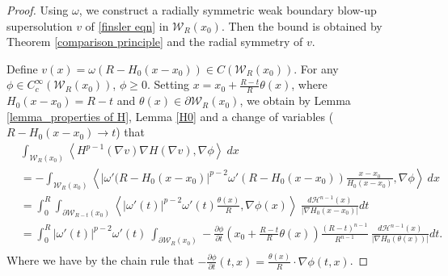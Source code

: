 \documentclass[11pt]{amsart}
\newcommand{\Fin}[1]{H^{p-1}(\nabla #1)\nabla H(\nabla #1)}
\numberwithin{equation}{section}
\begin{document}
 \begin{proof}
     Using $\omega$, we construct a radially symmetric weak boundary blow-up  supersolution $v$ of \eqref{finsler eqn} in $\mathcal{W}_{R}(x_{0})$. Then the bound is obtained by Theorem \ref{comparison principle} and the radial symmetry of $v$.

     
    Define $v(x)=\omega(R-H_{0}(x-x_{0}))\in C(\mathcal{W}_{R}(x_{0}))$. For any $\phi\in C_{c}^{\infty}(\mathcal{W}_{R}(x_{0}))$, $\phi\geq 0$. Setting $x=x_{0}+\frac{R-t}{R}\theta(x)$, where $H_{0}(x-x_{0})=R-t$ and $\theta(x)\in \partial \mathcal{W}_{R}(x_{0})$, we obtain  by Lemma \ref{lemma_properties of H}, Lemma \ref{H0} and a change of variables ($ R-H_{0}(x-x_{0})\to t$) that
     \begin{equation}\label{eqn_eta'}
     \begin{split}
    &\int_{\mathcal{W}_{R}(x_{0})}\left<\Fin{v}, \nabla\phi \right>\ dx\\
    &=-\int_{\mathcal{W}_{R}(x_{0})}\left<|\omega'(R-H_{0}(x-x_{0})|^{p-2}\omega'(R-H_{0}(x-x_{0})) \frac{x-x_{0}}{H_{0}(x-x_{0})}, \nabla \phi \right>\ dx\\
      &=\int_{0}^{R}\int_{\partial \mathcal{W}_{R-t}(x_{0})}\left<|\omega'(t)|^{p-2}\omega'(t) \frac{\theta(x)}{R}, \nabla \phi(x) \right> \ \frac{d\mathcal{H}^{n-1}(x)}{|\nabla H_{0}(x-x_{0})|} dt\\
        &=\int_{0}^{R}|\omega'(t)|^{p-2}\omega'(t)~ \int_{\partial \mathcal{W}_{R}(x_{0})}-\frac{\partial \phi}{\partial t}\left(x_{0}+\frac{R-t}{R}\theta(x)\right) \frac{(R-t)^{n-1}}{R^{n-1}} \ \frac{d\mathcal{H}^{n-1}(x)}{|\nabla H_{0}(\theta(x))|} dt.\\ 
         \end{split}
     \end{equation}
    Where we have by the chain rule that $-\frac{\partial \phi}{\partial t}(t,x)=\frac{\theta(x)}{R}\cdot \nabla \phi(t,x)$. %
     

\end{proof}
\end{document}
